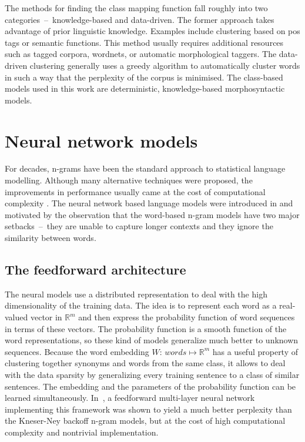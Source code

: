 	The methods for finding the class mapping function fall roughly into two categories~--~\mbox{knowledge-based} and \mbox{data-driven}. The former approach takes advantage of prior linguistic knowledge. Examples include clustering based on \gls{pos} tags or semantic functions. This method usually requires additional resources such as tagged corpora, wordnets, or automatic morphological taggers. The \mbox{data-driven} clustering generally uses a greedy algorithm to automatically cluster words in such a way that the perplexity of the corpus is minimised. The \mbox{class-based} models used in this work are deterministic, \mbox{knowledge-based} morphosyntactic models.
	\section{Neural network models}
	\label{section:rnn}
	For decades, n-grams have been the standard approach to statistical language modelling. Although many alternative techniques were proposed, the improvements in performance usually came at the cost of computational complexity \cite{mikolov2011rnnlm}. The neural network based language models were introduced in \cite{bengio2003neural} and motivated by the observation that the \mbox{word-based} \mbox{n-gram} models have two major setbacks~--~they are unable to capture longer contexts and they ignore the similarity between words. 
	\subsection{The feedforward architecture}	
The neural models use a distributed representation to deal with the high dimensionality of the training data. The idea is to represent each word as a \mbox{real-valued} vector in $\mathbb{R}^{m}$ and then express the probability function of word sequences in terms of these vectors. The probability function is a smooth function of the word representations, so these kind of models generalize much better to unknown sequences. Because the word embedding $W$: $words \mapsto \mathbb{R}^{m}$ has a useful property of clustering together synonyms and words from the same class, it allows to deal with the data sparsity by generalizing every training sentence to a class of similar sentences. The embedding and the parameters of the probability function can be learned simultaneously. In~\cite{bengio2003neural}, a feedforward multi-layer neural network implementing this framework was shown to yield a much better perplexity than the \mbox{Kneser-Ney} backoff \mbox{n-gram} models, but at the cost of high computational complexity and nontrivial implementation.
